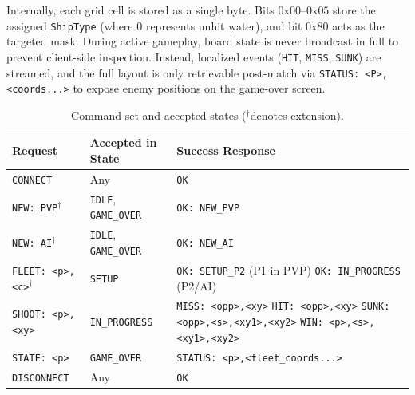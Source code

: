 Internally, each grid cell is stored as a single byte. Bits $0\text{x}00$--$0\text{x}05$ store the assigned \texttt{ShipType} (where 0 represents unhit water), and bit $0\text{x}80$ acts as the targeted mask. During active gameplay, board state is never broadcast in full to prevent client-side inspection. Instead, localized events (\texttt{HIT}, \texttt{MISS}, \texttt{SUNK}) are streamed, and the full layout is only retrievable post-match via \texttt{STATUS: <P>,<coords...>} to expose enemy positions on the game-over screen.

\begin{table}[t]
\centering
\caption{Command set and accepted states ($^\dagger$denotes extension).}
\label{tab:commands}
\scriptsize
\begin{tabular}{@{}L{2.2cm}L{1.9cm}L{3.9cm}@{}}
\toprule
Request & Accepted in State & Success Response \\
\midrule
\texttt{CONNECT} & Any & \texttt{OK} \\
\texttt{NEW: PVP}$^\dagger$ & \texttt{IDLE}, \texttt{GAME\_OVER} & \texttt{OK: NEW\_PVP} \\
\texttt{NEW: AI}$^\dagger$ & \texttt{IDLE}, \texttt{GAME\_OVER} & \texttt{OK: NEW\_AI} \\
\texttt{FLEET: <p>,<c>}$^\dagger$ & \texttt{SETUP} & \texttt{OK: SETUP\_P2} (P1 in PVP) \newline \texttt{OK: IN\_PROGRESS} (P2/AI) \\
\texttt{SHOOT: <p>,<xy>} & \texttt{IN\_PROGRESS} & \texttt{MISS: <opp>,<xy>} \newline \texttt{HIT: <opp>,<xy>} \newline \texttt{SUNK: <opp>,<s>,<xy1>,<xy2>} \newline \texttt{WIN: <p>,<s>,<xy1>,<xy2>} \\
\texttt{STATE: <p>} & \texttt{GAME\_OVER} & \texttt{STATUS: <p>,<fleet\_coords...>} \\
\texttt{DISCONNECT} & Any & \texttt{OK} \\
\bottomrule
\end{tabular}
\end{table}

